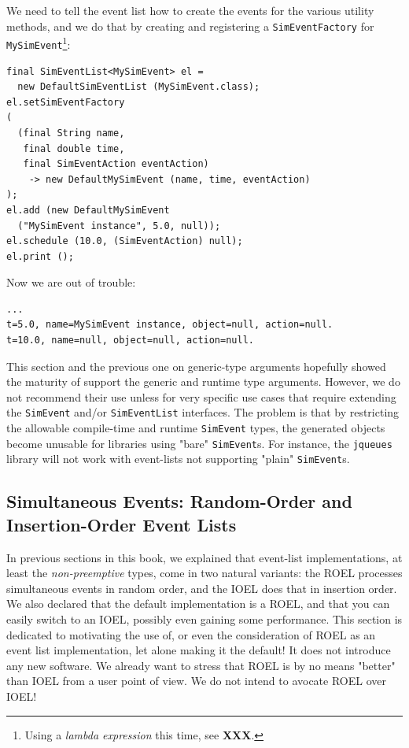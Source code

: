 \documentclass[12pt]{book}
\begin{document}
We need to tell the event list how to create the events
  for the various utility methods,
  and we do that by creating and registering a
  \lstinline|SimEventFactory| for \lstinline|MySimEvent|\footnote{
Using a {\em lambda expression\/} this time, see {\bf XXX}.}:
\begin{lstlisting}[basicstyle=\footnotesize]
final SimEventList<MySimEvent> el =
  new DefaultSimEventList (MySimEvent.class);
el.setSimEventFactory
(
  (final String name,
   final double time,
   final SimEventAction eventAction)
    -> new DefaultMySimEvent (name, time, eventAction)
);
el.add (new DefaultMySimEvent
  ("MySimEvent instance", 5.0, null));
el.schedule (10.0, (SimEventAction) null);
el.print ();
\end{lstlisting}
Now we are out of trouble:
\begin{lstlisting}[basicstyle=\footnotesize]
...
t=5.0, name=MySimEvent instance, object=null, action=null.
t=10.0, name=null, object=null, action=null.
\end{lstlisting}
  
This section and the previous one on generic-type
  arguments hopefully showed the maturity of
  support the generic and runtime type arguments.
However,
  we do not recommend their use unless
  for very specific use cases
  that require extending the
  \lstinline|SimEvent| and/or \lstinline|SimEventList|
  interfaces.
The problem is that by restricting the
  allowable compile-time and runtime \lstinline|SimEvent|
  types, the generated objects
  become unusable for libraries
  using "bare" \lstinline|SimEvent|s.
For instance,
  the \lstinline|jqueues| library
  will not work with event-lists
  not supporting "plain" \lstinline|SimEvent|s.

\subsection{Simultaneous Events: Random-Order and Insertion-Order Event Lists}
\label{sec:el:simul:roel-ioel}

In previous sections in this book,
  we explained that event-list implementations,
  at least the {\em non-preemptive\/} types,
  come in two natural variants:
  the ROEL processes simultaneous events in random order,
  and the IOEL does that in insertion order.
We also declared that the default implementation is a
  ROEL, and that you can easily switch to an IOEL,
  possibly even gaining some performance.
This section is dedicated to motivating the use of,
  or even the consideration of ROEL as an event list implementation,
  let alone making it the default!
It does not introduce any new software.
We already want to stress that ROEL is by no means
  "better" than IOEL from a user point of view.
We do not intend to avocate ROEL over IOEL!
\end{document}
